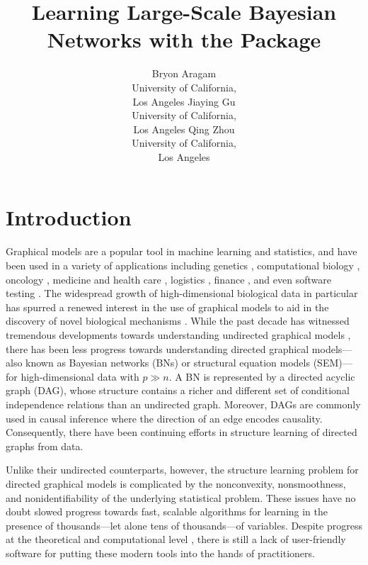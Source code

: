 \documentclass[article]{jss}
\author{Bryon Aragam\\University of California,\\ Los Angeles \And 
       Jiaying Gu\\University of California,\\ Los Angeles \And
       Qing Zhou\\University of California,\\ Los Angeles}
\title{Learning Large-Scale Bayesian Networks with the \pkg{sparsebn} Package}
\renewcommand{\|}{\,|\,}
\begin{document}


\section{Introduction}
\label{sec:intro}

Graphical models are a popular tool in machine learning and statistics, and have been used in a variety of applications including genetics \citep{gao2015,isci2015}, computational biology \citep{jones2012}, oncology \citep{chen2015}, medicine and health care \citep{velikova2014}, logistics \citep{garvey2015}, finance \citep{sanford2012}, and even software testing \citep{dejaeger2013}. The widespread growth of high-dimensional biological data in particular has spurred a renewed interest in the use of graphical models to aid in the discovery of novel biological mechanisms \citep{buhlmann2014bio}. While the past decade has witnessed tremendous developments towards understanding undirected graphical models \citep{meinshausen2006,ravikumar2010,yang2015}, there has been less progress towards understanding directed graphical models---also known as Bayesian networks (BNs) or structural equation models (SEM)---for high-dimensional data with $p\gg n$. A BN is represented by a directed acyclic graph (DAG), whose structure contains a richer and different set of conditional independence relations than an undirected graph. Moreover, DAGs are commonly used in causal inference where the direction of an edge encodes causality. Consequently, there have been continuing efforts in structure learning of directed graphs from data.

Unlike their undirected counterparts, however, the structure learning problem for directed graphical models is complicated by the nonconvexity, nonsmoothness, and nonidentifiability of the underlying statistical problem. These issues have no doubt slowed progress towards fast, scalable algorithms for learning in the presence of thousands---let alone tens of thousands---of variables. Despite progress at the theoretical \citep{geer2013,aragam2016} and computational level \citep{schmidt2007,xiang2013,fu2013}, there is still a lack of user-friendly software for putting these modern tools into the hands of practitioners.
\end{document}
